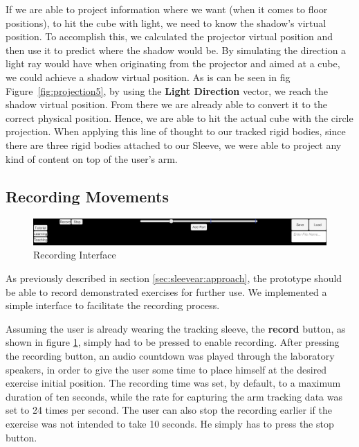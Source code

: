 If we are able to project information where we want (when it comes to floor positions), to hit the cube with light, we need to know the shadow's virtual position. 
To accomplish this, we calculated the projector virtual position and then use it to predict where the shadow would be. 
By simulating the direction a light ray would have when originating from the projector and aimed at a cube, we could achieve a shadow virtual position. 
As is can be seen in fig Figure~\ref{fig:projection5}, by using the \textbf{Light Direction} vector, we reach the shadow virtual position. 
From there we are already able to convert it to the correct physical position. Hence, we are able to hit the actual cube with the circle projection.
When applying this line of thought to our tracked rigid bodies, since there are three rigid bodies attached to our Sleeve, 
we were able to project any kind of content on top of the user's arm.

\subsection{Recording Movements}

\begin{figure}[!b]
    \begin{center}
        \includegraphics[width=\textwidth]{imgs/impl/recordinginterface}
    \end{center}
    \caption{Recording Interface }
    \label{fig:recordinginterface}
\end{figure}


As previously described in section \ref{sec:sleevear:approach}, the prototype should be able to record demonstrated exercises for further use.
We implemented a simple interface to facilitate the recording process.

Assuming the user is already wearing the tracking sleeve, the \textbf{record} button, as shown in figure \ref{fig:recordinginterface}, simply had to be pressed to enable recording. 
After pressing the recording button, an audio countdown was played through the laboratory speakers, in order to give the user some time to place himself at the desired exercise initial position. 
The recording time was set, by default, to a maximum duration of ten seconds, while the rate for capturing the arm tracking data was set to 24 times per second.
The user can also stop the recording earlier if the exercise was not intended to take 10 seconds. He simply has to press the stop button.

